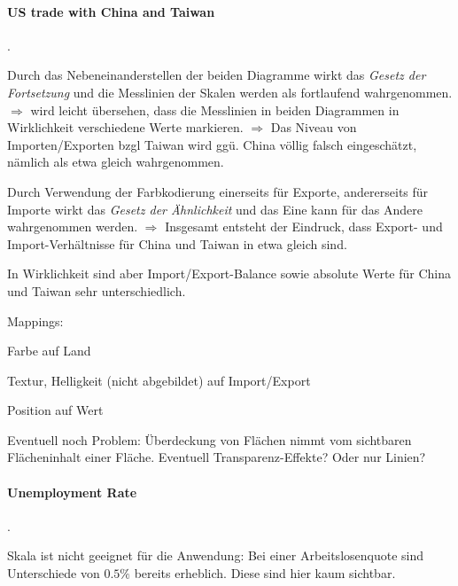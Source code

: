 \documentclass[10pt]{article} %
\begin{document}
\paragraph{US trade with China and Taiwan} .


\begin{cptitemize}
\item Durch das Nebeneinanderstellen der beiden Diagramme wirkt das \textit{Gesetz
  der Fortsetzung} und die Messlinien der Skalen werden als fortlaufend
wahrgenommen.
$\Rightarrow$ wird leicht übersehen, dass die Messlinien in beiden
Diagrammen in Wirklichkeit verschiedene Werte markieren.
$\Rightarrow$ Das Niveau von Importen/Exporten bzgl Taiwan wird ggü. China völlig falsch
eingeschätzt, nämlich als etwa gleich wahrgenommen.
\item Durch Verwendung der Farbkodierung einerseits für Exporte, andererseits für
Importe wirkt das \textit{Gesetz der Ähnlichkeit} und das Eine kann für das
Andere wahrgenommen werden.
$\Rightarrow$ Insgesamt entsteht der Eindruck, dass Export- und Import-Verhältnisse für
China und Taiwan in etwa gleich sind.
\item In Wirklichkeit sind aber Import/Export-Balance sowie absolute Werte für China
und Taiwan sehr unterschiedlich.
\end{cptitemize}


Mappings:
\begin{cptitemize}
\item Farbe auf Land
\item Textur, Helligkeit (nicht abgebildet) auf Import/Export
\item Position auf Wert
\end{cptitemize}
Eventuell noch Problem: Überdeckung von Flächen nimmt vom sichtbaren
Flächeninhalt einer Fläche. Eventuell Transparenz-Effekte? Oder nur Linien?


\paragraph{Unemployment Rate} .


\begin{cptitemize}
  \item Skala ist nicht geeignet für die Anwendung: Bei einer Arbeitslosenquote
    sind Unterschiede von $0.5\%$ bereits erheblich. Diese sind hier kaum sichtbar.
\end{cptitemize}

\end{document}
